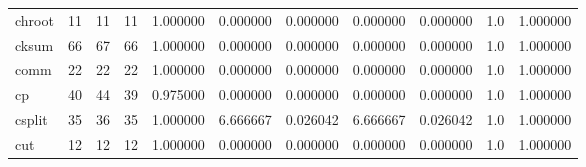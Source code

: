 \begin{tabular}{lrrrrrrrrrr}
chroot    &                                      11 &                 11 &                                11 &                                   1.000000 &                               0.000000 &                                     0.000000 &                          0.000000 &                                0.000000 &                                1.0 &                                           1.000000 \\
cksum     &                                      66 &                 67 &                                66 &                                   1.000000 &                               0.000000 &                                     0.000000 &                          0.000000 &                                0.000000 &                                1.0 &                                           1.000000 \\
comm      &                                      22 &                 22 &                                22 &                                   1.000000 &                               0.000000 &                                     0.000000 &                          0.000000 &                                0.000000 &                                1.0 &                                           1.000000 \\
cp        &                                      40 &                 44 &                                39 &                                   0.975000 &                               0.000000 &                                     0.000000 &                          0.000000 &                                0.000000 &                                1.0 &                                           1.000000 \\
csplit    &                                      35 &                 36 &                                35 &                                   1.000000 &                               6.666667 &                                     0.026042 &                          6.666667 &                                0.026042 &                                1.0 &                                           1.000000 \\
cut       &                                      12 &                 12 &                                12 &                                   1.000000 &                               0.000000 &                                     0.000000 &                          0.000000 &                                0.000000 &                                1.0 &                                           1.000000 \\

\end{tabular}
